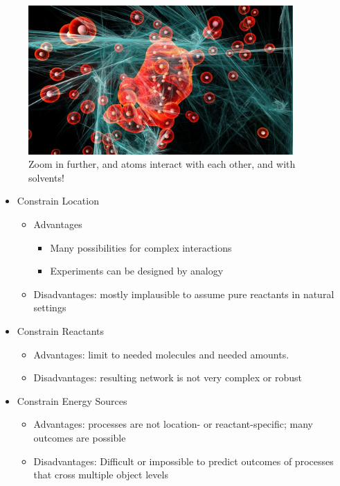 \documentclass[]{article}
\begin{document}
\begin{figure}[H]
	\caption{Zoom in further, and atoms interact with each other, and with solvents!}\label{fig:MolecularInteractions} 
	\includegraphics[width=0.9\textwidth]{MolecularInteractions}
\end{figure}

\begin{itemize}
	\item Constrain Location 
	\begin{itemize}
		\item Advantages
		\begin{itemize}
			\item Many possibilities for
			complex interactions
			\item Experiments can be
			designed by analogy
		\end{itemize}
		\item Disadvantages: mostly implausible to
		assume pure reactants in
		natural settings
	\end{itemize}
	\item Constrain Reactants
	\begin{itemize}
		\item Advantages: limit to needed molecules and needed amounts.
		\item Disadvantages: resulting network is not very complex or robust
	\end{itemize}	
	\item Constrain Energy Sources
		\begin{itemize}
		\item Advantages: processes are not location-
		or reactant-specific; many
		outcomes are possible
		\item Disadvantages: Difficult or impossible to
		predict outcomes of
		processes that cross
		multiple object levels
	\end{itemize}
\end{itemize}
\end{document}
